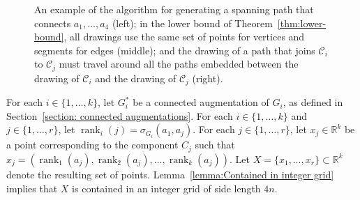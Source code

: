 \documentclass{patmorin}
\DeclareMathOperator{\rank}{rank}
\newcommand{\R}{\mathbb{R}}
\begin{document}
\begin{figure}[b]
   \caption{\small An example of the algorithm for generating a spanning path that connects $a_1,\ldots,a_4$ (left); in the lower bound of Theorem~\ref{thm:lower-bound}, all
    drawings use the same set of points for vertices and segments for
    edges (middle); and the drawing of a path that joins $\mathcal{C}_i$ to
    $\mathcal{C}_j$ must travel around all the paths embedded between the
    drawing of $\mathcal{C}_i$ and the drawing of $\mathcal{C}_j$ (right).}
   \label{figure:big-example}
\end{figure}

For each $i\in \{1,\dots,k\}$, let $G_i^*$ be a connected augmentation of $G_i$, as defined in Section~\ref{section: connected augmentations}. For each $i\in\{1,\ldots,k\}$ and $j\in\{1,\ldots,r\}$, let $\rank_i(j) = \sigma_{G_i}(a_1, a_j)$. For each $j\in\{1,\ldots,r\}$, let $x_j\in \mathbb{R}^k$ be a point corresponding to the component $C_j$ such that $x_j = (\rank_1(a_j), \rank_2(a_j), \ldots, \rank_k(a_j))$. Let $X = \{x_1, \ldots, x_r\}\subset\R^k$ denote the resulting set of points. Lemma~\ref{lemma:Contained in integer grid} implies that $X$ is contained in an integer grid of side length $4n$.
\end{document}
